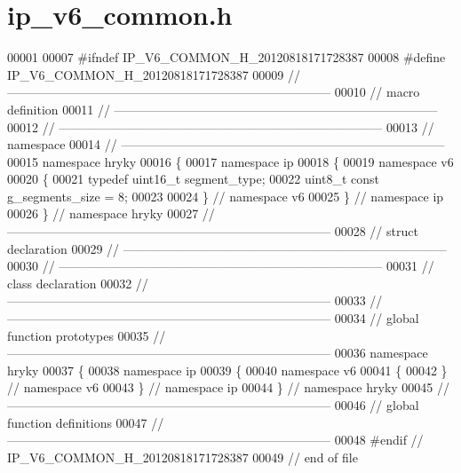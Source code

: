 \hypertarget{ip__v6__common_8h_source}{\section{ip\-\_\-v6\-\_\-common.\-h}
}

\begin{DoxyCode}
00001 
00007 \textcolor{preprocessor}{#ifndef IP\_V6\_COMMON\_H\_20120818171728387}
00008 \textcolor{preprocessor}{}\textcolor{preprocessor}{#define IP\_V6\_COMMON\_H\_20120818171728387}
00009 \textcolor{preprocessor}{}\textcolor{comment}{//
      ------------------------------------------------------------------------------}
00010 \textcolor{comment}{// macro definition}
00011 \textcolor{comment}{//
      ------------------------------------------------------------------------------}
00012 \textcolor{comment}{//
      ------------------------------------------------------------------------------}
00013 \textcolor{comment}{// namespace}
00014 \textcolor{comment}{//
      ------------------------------------------------------------------------------}
00015 \textcolor{keyword}{namespace }hryky
00016 \{
00017 \textcolor{keyword}{namespace }ip
00018 \{
00019 \textcolor{keyword}{namespace }v6
00020 \{
00021     \textcolor{keyword}{typedef} uint16\_t segment\_type;
00022     uint8\_t \textcolor{keyword}{const} g\_segments\_size = 8;
00023     
00024 \} \textcolor{comment}{// namespace v6}
00025 \} \textcolor{comment}{// namespace ip}
00026 \} \textcolor{comment}{// namespace hryky}
00027 \textcolor{comment}{//
      ------------------------------------------------------------------------------}
00028 \textcolor{comment}{// struct declaration}
00029 \textcolor{comment}{//
      ------------------------------------------------------------------------------}
00030 \textcolor{comment}{//
      ------------------------------------------------------------------------------}
00031 \textcolor{comment}{// class declaration}
00032 \textcolor{comment}{//
      ------------------------------------------------------------------------------}
00033 \textcolor{comment}{//
      ------------------------------------------------------------------------------}
00034 \textcolor{comment}{// global function prototypes}
00035 \textcolor{comment}{//
      ------------------------------------------------------------------------------}
00036 \textcolor{keyword}{namespace }hryky
00037 \{
00038 \textcolor{keyword}{namespace }ip
00039 \{
00040 \textcolor{keyword}{namespace }v6
00041 \{
00042 \} \textcolor{comment}{// namespace v6}
00043 \} \textcolor{comment}{// namespace ip}
00044 \} \textcolor{comment}{// namespace hryky}
00045 \textcolor{comment}{//
      ------------------------------------------------------------------------------}
00046 \textcolor{comment}{// global function definitions}
00047 \textcolor{comment}{//
      ------------------------------------------------------------------------------}
00048 \textcolor{preprocessor}{#endif // IP\_V6\_COMMON\_H\_20120818171728387}
00049 \textcolor{preprocessor}{}\textcolor{comment}{// end of file}
\end{DoxyCode}
